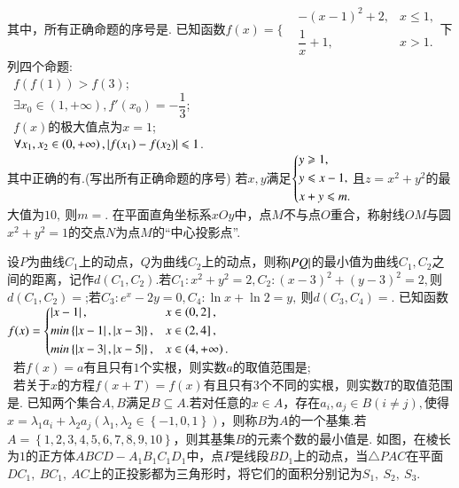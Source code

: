 \documentclass{BHCexam}
\begin{document}
\begin{questions}
其中，所有正确命题的序号是\tk.
\qs 已知函数$f(x)=\Bigg\{\begin{aligned}
&-(x-1)^2+2,&x\le1,\\
&\dfrac{1}{x}+1,&x>1.
\end{aligned}$下列四个命题:\\
~$ f\left(f(1)\right) >f(3)$;\\
~$ \exists x_0\in\left(1,+\infty\right),f'(x_0)=-\dfrac{1}{3} $;\\
~$ f(x)$的极大值点为$ x=1 $;\\
~$ \forall x_1,x_2\in\left(0,+\infty\right),\abs{f(x_1)-f(x_2)}\le1 $.\\
其中正确的有\tk.(写出所有正确命题的序号)
\qs 若$x,y$满足$\begin{dcases}
y\ge1,\\
y\le x-1,\\
x+y\le m.
\end{dcases}$且$ z=x^2+y^2 $的最大值为$ 	10,~ $则$ m= $\tk.
\qs 在平面直角坐标系$xOy$中，点$ M $不与点$ O $重合，称射线$ OM $与圆$ x^2+y^2=1 $的交点$ N $为点$ M $的“中心投影点”.
\qs 设$ P $为曲线$ C_1 $上的动点，$ Q $为曲线$ C_2 $上的动点，则称$ \abs{PQ} $的最小值为曲线$ C_1,C_2 $之间的距离，记作$ d(C_1,C_2) $.若$ C_1:x^2+y^2=2,C_2:(x-3)^2+(y-3)^2=2, $则$ d(C_1,C_2)= $\tk;若$ C_3:e^x-2y=0,C_4:\ln x+\ln 2=y,~ $则$ d(C_3,C_4)= $\tk.
\qs 已知函数$f(x)=\begin{dcases}
\abs{x-1},&x\in\left(0,2\right],\\
min\left\{\abs{x-1},\abs{x-3}\right\},&x\in\left(2,4\right],\\
min\left\{\abs{x-3},\abs{x-5}\right\},&x\in\left(4,+\infty\right).
\end{dcases}$\\
~若$f(x)=a$有且只有$ 1 $个实根，则实数$ a $的取值范围是\tk;\\
~若关于$ x $的方程$ f(x+T)=f(x) $有且只有$ 3 $个不同的实根，则实数$ T $的取值范围是\tk.
\qs 已知两个集合$ A,B $满足$ B\subseteq A $.若对任意的$ x\in A $，存在$ a_i,a_j\in B(i\ne j) ,$使得$ x=\lambda_1a_i+\lambda_2a_j(\lambda_1,\lambda_2\in\left\{-1,0,1\right\}) $，则称$ B $为$ A $的一个基集.若$ A=\left\{1,2,3,4,5,6,7,8,9,10\right\} $，则其基集$ B $的元素个数的最小值是\tk.
\qs 如图，在棱长为$ 1 $的正方体$ABCD-A_1B_1C_1D_1$中，点$ P $是线段$ BD_1 $上的动点，当$ \triangle PAC $在平面$ DC_1,~BC_1,~AC $上的正投影都为三角形时，将它们的面积分别记为$ S_1,~S_2,~S_3 $.
\begin{parts}

\end{parts}
\end{questions}
\end{document}
